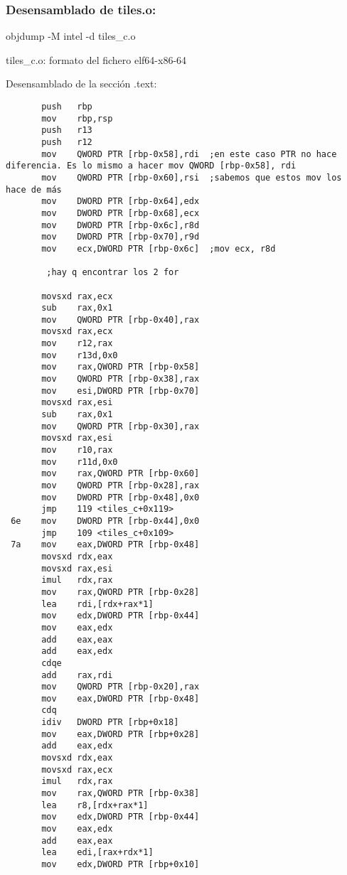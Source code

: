 \subsubsection{Desensamblado de tiles.o:}
objdump -M intel -d tiles_c.o

tiles_c.o:     formato del fichero elf64-x86-64

Desensamblado de la sección .text:

\begin{codesnippet}
\begin{verbatim}
       push   rbp
       mov    rbp,rsp
       push   r13
       push   r12
       mov    QWORD PTR [rbp-0x58],rdi	;en este caso PTR no hace diferencia. Es lo mismo a hacer mov QWORD [rbp-0x58], rdi
       mov    QWORD PTR [rbp-0x60],rsi	;sabemos que estos mov los hace de más
       mov    DWORD PTR [rbp-0x64],edx
       mov    DWORD PTR [rbp-0x68],ecx
       mov    DWORD PTR [rbp-0x6c],r8d
       mov    DWORD PTR [rbp-0x70],r9d
       mov    ecx,DWORD PTR [rbp-0x6c]	;mov ecx, r8d
       
		;hay q encontrar los 2 for
       
       movsxd rax,ecx
       sub    rax,0x1
       mov    QWORD PTR [rbp-0x40],rax
       movsxd rax,ecx
       mov    r12,rax
       mov    r13d,0x0
       mov    rax,QWORD PTR [rbp-0x58]
       mov    QWORD PTR [rbp-0x38],rax
       mov    esi,DWORD PTR [rbp-0x70]
       movsxd rax,esi
       sub    rax,0x1
       mov    QWORD PTR [rbp-0x30],rax
       movsxd rax,esi
       mov    r10,rax
       mov    r11d,0x0
       mov    rax,QWORD PTR [rbp-0x60]
       mov    QWORD PTR [rbp-0x28],rax
       mov    DWORD PTR [rbp-0x48],0x0
       jmp    119 <tiles_c+0x119>
 6e    mov    DWORD PTR [rbp-0x44],0x0
       jmp    109 <tiles_c+0x109>
 7a    mov    eax,DWORD PTR [rbp-0x48]
       movsxd rdx,eax
       movsxd rax,esi
       imul   rdx,rax
       mov    rax,QWORD PTR [rbp-0x28]
       lea    rdi,[rdx+rax*1]
       mov    edx,DWORD PTR [rbp-0x44]
       mov    eax,edx
       add    eax,eax
       add    eax,edx
       cdqe   
       add    rax,rdi
       mov    QWORD PTR [rbp-0x20],rax
       mov    eax,DWORD PTR [rbp-0x48]
       cdq    
       idiv   DWORD PTR [rbp+0x18]
       mov    eax,DWORD PTR [rbp+0x28]
       add    eax,edx
       movsxd rdx,eax
       movsxd rax,ecx
       imul   rdx,rax
       mov    rax,QWORD PTR [rbp-0x38]
       lea    r8,[rdx+rax*1]
       mov    edx,DWORD PTR [rbp-0x44]
       mov    eax,edx
       add    eax,eax
       lea    edi,[rax+rdx*1]
       mov    edx,DWORD PTR [rbp+0x10]
\end{verbatim}
\end{codesnippet}
